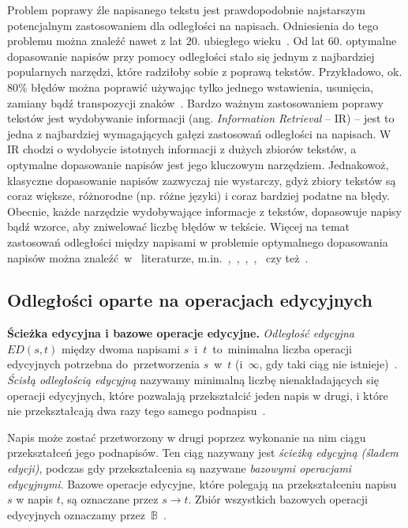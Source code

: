 \documentclass{praca1}
\begin{document}
Problem poprawy źle napisanego tekstu jest prawdopodobnie najstarszym potencjalnym zastosowaniem dla odległości na napisach. Odniesienia do tego problemu można znaleźć nawet z lat $20.$ ubiegłego wieku~\cite{Masters1927:spelling}. Od lat $60.$ optymalne dopasowanie napisów przy pomocy odległości stało się jednym z najbardziej popularnych narzędzi, które radziłoby sobie z poprawą tekstów. Przykładowo, ok. $80\%$ błędów można poprawić używając tylko jednego wstawienia, usunięcia, zamiany bądź transpozycji znaków~\cite{Damerau1964:technique}. Bardzo ważnym zastosowaniem poprawy tekstów jest wydobywanie informacji (ang. \emph{Information Retrieval} -- IR) -- jest to jedna z najbardziej wymagających gałęzi zastosowań odległości na napisach. W IR chodzi o wydobycie istotnych informacji z dużych zbiorów tekstów, a optymalne dopasowanie napisów jest jego kluczowym narzędziem. Jednakowoż, klasyczne dopasowanie napisów zazwyczaj nie wystarczy, gdyż zbiory tekstów są coraz większe, różnorodne (np. różne języki) i coraz bardziej podatne na błędy. Obecnie, każde narzędzie wydobywające informacje z tekstów,   dopasowuje napisy bądź wzorce, aby zniwelować liczbę błędów w tekście. Więcej na temat zastosowań odległości między napisami w problemie optymalnego dopasowania napisów można znaleźć~w~ literaturze, m.in.~\cite{Boytsov2011:indexingmethods},~\cite{Navarro2001:guidedtour},~\cite{Wagner1974:stringtostring},~\cite{Wagner1975:extensionstring},~\cite{Owolabi1988:fast} czy też~\cite{Kukich1992:correcting}.

\subsection{Odległości oparte na operacjach edycyjnych}

\textbf{Ścieżka edycyjna i bazowe operacje edycyjne.} \emph{Odległość edycyjna} $ED(s,t)$ między dwoma napisami $s$~i~$t$~to~minimalna liczba operacji edycyjnych potrzebna do~przetworzenia $s$~w~$t$ (i~$\infty$, gdy taki ciąg nie istnieje)~\cite{Navarro2001:guidedtour}. \emph{Ścisłą odległością edycyjną} nazywamy minimalną liczbę nienakładających się operacji edycyjnych, które pozwalają przekształcić jeden napis w drugi, i które nie przekształcają dwa razy tego samego podnapisu~\cite{Boytsov2011:indexingmethods}.

Napis może zostać przetworzony w drugi poprzez wykonanie na nim ciągu przekształceń jego podnapisów. Ten ciąg nazywany jest \emph{ścieżką edycyjną (śladem edycji)}, podczas gdy przekształcenia są nazywane \emph{bazowymi operacjami edycyjnymi}. Bazowe operacje edycyjne, które polegają na przekształceniu napisu $s$ w napis $t$, są oznaczane przez $s \rightarrow t$. Zbiór wszystkich bazowych operacji edycyjnych oznaczamy przez~$\mathbb{B}$~\cite{Boytsov2011:indexingmethods}. 
\end{document}
